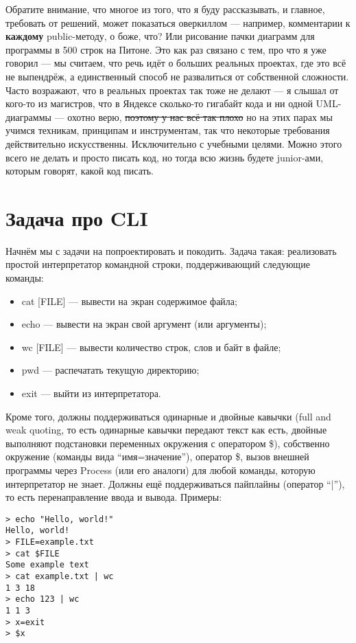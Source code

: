 \documentclass[a5paper]{article}
\begin{document}
Обратите внимание, что многое из того, что я буду рассказывать, и главное, требовать от решений, может показаться оверкиллом --- например, комментарии к \textbf{каждому} public-методу, о боже, что? Или рисование пачки диаграмм для программы в 500 строк на Питоне. Это как раз связано с тем, про что я уже говорил --- мы считаем, что речь идёт о больших реальных проектах, где это всё не выпендрёж, а единственный способ не развалиться от собственной сложности. Часто возражают, что в реальных проектах так тоже не делают --- я слышал от кого-то из магистров, что в Яндексе сколько-то гигабайт кода и ни одной UML-диаграммы --- охотно верю, \sout{поэтому у нас всё так плохо} но на этих парах мы учимся техникам, принципам и инструментам, так что некоторые требования действительно искусственны. Исключительно с учебными целями. Можно этого всего не делать и просто писать код, но тогда всю жизнь будете junior-ами, которым говорят, какой код писать.

\section{Задача про CLI}

Начнём мы с задачи на попроектировать и покодить. Задача такая: реализовать простой интерпретатор командной строки, поддерживающий следующие команды:

\begin{itemize}
	\item cat [FILE] --- вывести на экран содержимое файла;
	\item echo --- вывести на экран свой аргумент (или аргументы);
	\item wc [FILE] --- вывести количество строк, слов и байт в файле;
	\item pwd --- распечатать текущую директорию;
	\item exit --- выйти из интерпретатора.
\end{itemize}

Кроме того, должны поддерживаться одинарные и двойные кавычки (full and weak quoting, то есть одинарные кавычки передают текст как есть, двойные выполняют подстановки переменных окружения с оператором \$), собственно окружение (команды вида ``имя=значение''), оператор \$, вызов внешней программы через Process (или его аналоги) для любой команды, которую интерпретатор не знает. Должны ещё поддерживаться пайплайны (оператор ``|''), то есть перенаправление ввода и вывода. Примеры:

\begin{verbatim}
> echo "Hello, world!"
Hello, world!
> FILE=example.txt
> cat $FILE
Some example text
> cat example.txt | wc
1 3 18
> echo 123 | wc
1 1 3
> x=exit
> $x
\end{verbatim}
\end{document}

